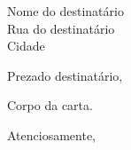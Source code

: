 \documentclass{letter}
\begin{document}
\begin{letter}{Nome do destinatário \\ Rua do destinatário \\ Cidade}
\opening{Prezado destinatário,}

Corpo da carta.

\closing{Atenciosamente,}

\end{letter}
\end{document}
